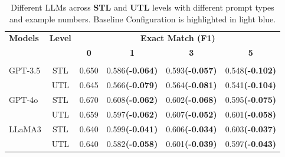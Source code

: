 \begin{table}[h]
    \centering %
    \scriptsize %
    \caption{Different LLMs across \textbf{STL} and \textbf{UTL} levels with different prompt types and example numbers. Baseline Configuration is highlighted in \colorbox{blue!10}{light blue}.}
\label{tab:prompt_type_with_examples}  
    \setlength{\tabcolsep}{1pt}
    \begin{tabular}{l c c c c c}
    \toprule  
    \multirow{2}{*}{\textbf{Models}} & \multirow{2}{*}{\textbf{Level}} & 
    \multicolumn{4}{c}{\textbf{Exact Match (F1)}} \\  
    \cmidrule(lr){3-6}
    & & \textbf{0} & \textbf{1} & \textbf{3} & \textbf{5} \\  
    \midrule
    \rowcolor{black!10!} \multicolumn{6}{c}{\textbf{\textit{few-shot}}} \\
    \multirow{2}{*}{GPT-3.5} & STL & \colorbox{blue!10}{0.650} & 0.586\textbf{{\color{gray}\fontsize{5.5}{8.4}\selectfont(-0.064) }} & 0.593\textbf{{\color{gray}\fontsize{5.5}{8.4}\selectfont(-0.057) }} & 0.548\textbf{{\color{gray}\fontsize{5.5}{8.4}\selectfont(-0.102) }} \\  
                              & UTL & \colorbox{blue!10}{0.645} & 0.566\textbf{{\color{gray}\fontsize{5.5}{8.4}\selectfont(-0.079) }} & 0.564\textbf{{\color{gray}\fontsize{5.5}{8.4}\selectfont(-0.081) }} & 0.541\textbf{{\color{gray}\fontsize{5.5}{8.4}\selectfont(-0.104) }} \\  
    \cmidrule(lr){2-6}
    \multirow{2}{*}{GPT-4o} & STL & \colorbox{blue!10}{0.670} & 0.608\textbf{{\color{gray}\fontsize{5.5}{8.4}\selectfont(-0.062) }} & 0.602\textbf{{\color{gray}\fontsize{5.5}{8.4}\selectfont(-0.068) }} & 0.595\textbf{{\color{gray}\fontsize{5.5}{8.4}\selectfont(-0.075) }} \\  
                              & UTL & \colorbox{blue!10}{0.659} & 0.597\textbf{{\color{gray}\fontsize{5.5}{8.4}\selectfont(-0.062) }} & 0.607\textbf{{\color{gray}\fontsize{5.5}{8.4}\selectfont(-0.052) }} & 0.601\textbf{{\color{gray}\fontsize{5.5}{8.4}\selectfont(-0.058) }} \\  
    \cmidrule(lr){2-6} 
    \multirow{2}{*}{LLaMA3} & STL & \colorbox{blue!10}{0.640} & 0.599\textbf{{\color{gray}\fontsize{5.5}{8.4}\selectfont(-0.041) }} & 0.606\textbf{{\color{gray}\fontsize{5.5}{8.4}\selectfont(-0.034) }} & 0.603\textbf{{\color{gray}\fontsize{5.5}{8.4}\selectfont(-0.037) }} \\  
                                & UTL & \colorbox{blue!10}{0.640} & 0.582\textbf{{\color{gray}\fontsize{5.5}{8.4}\selectfont(-0.058) }} & 0.601\textbf{{\color{gray}\fontsize{5.5}{8.4}\selectfont(-0.039) }} & 0.597\textbf{{\color{gray}\fontsize{5.5}{8.4}\selectfont(-0.043) }} \\
    \midrule
  

\end{tabular}
\end{table}
